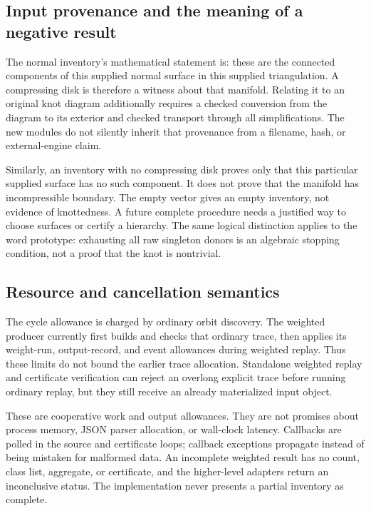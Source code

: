 \documentclass[11pt,a4paper]{article}
\theoremstyle{definition}
\theoremstyle{remark}
\begin{document}
\subsection{Input provenance and the meaning of a negative result}

The normal inventory's mathematical statement is: these are the connected
components of this supplied normal surface in this supplied triangulation.
A compressing disk is therefore a witness about that manifold. Relating
it to an original knot diagram additionally requires a checked conversion
from the diagram to its exterior and checked transport through all
simplifications. The new modules do not silently inherit that provenance
from a filename, hash, or external-engine claim.

Similarly, an inventory with no compressing disk proves only that this
particular supplied surface has no such component. It does not prove
that the manifold has incompressible boundary. The empty vector gives
an empty inventory, not evidence of knottedness. A future complete
procedure needs a justified way to choose surfaces or certify a hierarchy.
The same logical distinction applies to the word prototype: exhausting
all raw singleton donors is an algebraic stopping condition, not a proof
that the knot is nontrivial.

\subsection{Resource and cancellation semantics}

The cycle allowance is charged by ordinary orbit discovery. The weighted
producer currently first builds and checks that ordinary trace, then
applies its weight-run, output-record, and event allowances during weighted
replay. Thus these limits do not bound the earlier trace allocation.
Standalone weighted replay and certificate verification can reject an
overlong explicit trace before running ordinary replay, but they still
receive an already materialized input object.

These are cooperative work and output allowances. They are not promises
about process memory, JSON parser allocation, or wall-clock latency.
Callbacks are polled in the source and certificate loops; callback
exceptions propagate instead of being mistaken for malformed data.
An incomplete weighted result has no count, class list, aggregate, or
certificate, and the higher-level adapters return an inconclusive status.
The implementation never presents a partial inventory as complete.
\end{document}

